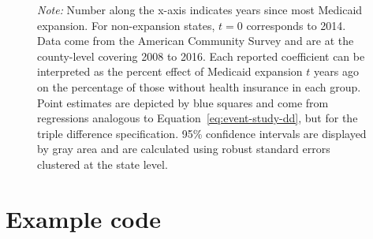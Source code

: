 \documentclass[12pt]{article}%
\begin{document}
\begin{appendices}
\begin{figure}[H]
\begin{minipage}{.6\linewidth}
              \label{fig:first_stage_event_ddd}
              \begin{justify}
                {\scriptsize
                    \emph{Note:} 
              Number along the x-axis indicates years since most Medicaid expansion. For non-expansion states, $t = 0$ corresponds to 2014.  
              Data come from the American Community Survey and are at the county-level covering 2008 to 2016.
              Each reported coefficient can be interpreted as the percent effect of Medicaid expansion $t$ years ago on the percentage of those without health insurance in each group. 
              Point estimates are depicted by blue squares and come from regressions analogous to Equation~\ref{eq:event-study-dd}, but for the triple difference specification. 
              95\% confidence intervals are displayed by gray area and are calculated using robust standard errors clustered at the state level.
                \par}
            \end{justify}
        \end{minipage}
    \end{figure}


\FloatBarrier
\newpage
\section{Example code}


\end{appendices}
\end{document}
